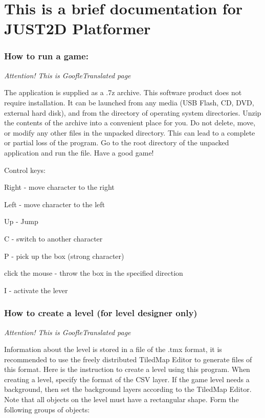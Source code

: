 \section*{This is a brief documentation for J\+U\+S\+T2D Platformer}

\subsubsection*{How to run a game\+:}

{\itshape Attention! This is Goofle\+Translated page}

The application is supplied as a .7z archive. This software product does not require installation. It can be launched from any media (U\+SB Flash, CD, D\+VD, external hard disk), and from the directory of operating system directories. Unzip the contents of the archive into a convenient place for you. Do not delete, move, or modify any other files in the unpacked directory. This can lead to a complete or partial loss of the program. Go to the root directory of the unpacked application and run the file. Have a good game!

Control keys\+:


\begin{DoxyItemize}
\item Right -\/ move character to the right


\item Left -\/ move character to the left


\item Up -\/ Jump


\item C -\/ switch to another character


\item P -\/ pick up the box (strong character)


\item click the mouse -\/ throw the box in the specified direction


\item I -\/ activate the lever 
\end{DoxyItemize}

\subsubsection*{How to create a level (for level designer only)}

{\itshape Attention! This is Goofle\+Translated page}

Information about the level is stored in a file of the .tmx format, it is recommended to use the freely distributed Tiled\+Map Editor to generate files of this format. Here is the instruction to create a level using this program. When creating a level, specify the format of the C\+SV layer. If the game level needs a background, then set the background layers according to the Tiled\+Map Editor. Note that all objects on the level must have a rectangular shape. Form the following groups of objects\+:


